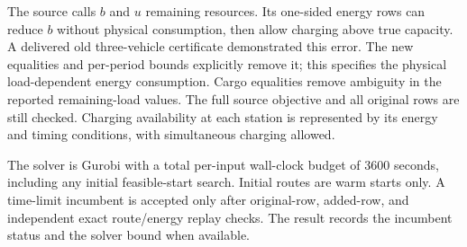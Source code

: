 \documentclass{article}
\begin{document}
The source calls $b$ and $u$ remaining resources. Its one-sided energy
rows can reduce $b$ without physical consumption, then allow charging
above true capacity. A delivered old three-vehicle certificate demonstrated
this error. The new equalities and per-period bounds explicitly remove it;
this specifies the physical load-dependent energy consumption. Cargo
equalities remove ambiguity in the reported remaining-load values.
The full source objective and all original rows are still checked.
Charging availability at each station is represented by its energy and timing conditions, with simultaneous charging allowed.

The solver is Gurobi with a total per-input wall-clock budget of 3600
seconds, including any initial feasible-start search. Initial routes are
warm starts only. A time-limit
incumbent is accepted only after original-row, added-row, and independent
exact route/energy replay checks. The result records the incumbent status and the solver bound when available.
\end{document}
